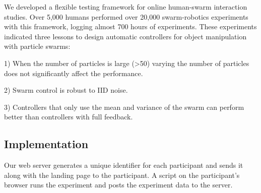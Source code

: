 

We developed a flexible testing framework for online human-swarm interaction studies. Over 5,000 humans performed over 20,000 swarm-robotics experiments with this framework, logging almost 700 hours of experiments.
These experiments indicated three lessons to design automatic controllers for object manipulation with particle swarms:

1) When the number of particles is large (>50) varying the number of particles does not significantly affect the performance.

2) Swarm control is robust to IID noise.

3) Controllers that only use the mean and variance of the swarm can perform better than controllers with full feedback.


\subsection{Implementation}

Our web server generates a unique identifier for each participant and sends it along with the landing page to the participant. 
A script on the participant's browser runs the experiment and posts the experiment data to the server. 

